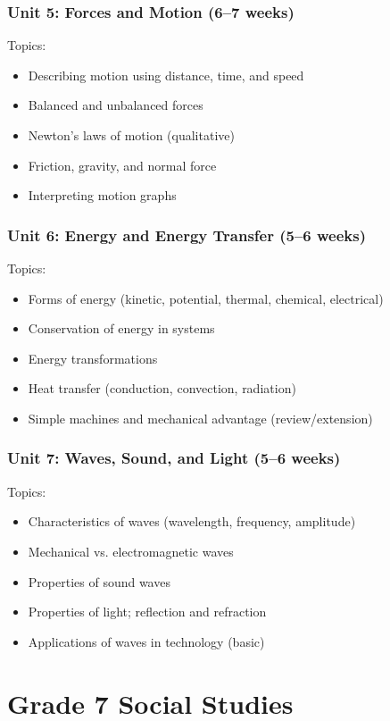 \documentclass[11pt,letterpaper]{report}
\begin{document}
\subsection{Unit 5: Forces and Motion (6–7 weeks)}

Topics:
\begin{itemize}
\item Describing motion using distance, time, and speed
\item Balanced and unbalanced forces
\item Newton’s laws of motion (qualitative)
\item Friction, gravity, and normal force
\item Interpreting motion graphs
\end{itemize}

\subsection{Unit 6: Energy and Energy Transfer (5–6 weeks)}

Topics:
\begin{itemize}
\item Forms of energy (kinetic, potential, thermal, chemical, electrical)
\item Conservation of energy in systems
\item Energy transformations
\item Heat transfer (conduction, convection, radiation)
\item Simple machines and mechanical advantage (review/extension)
\end{itemize}

\subsection{Unit 7: Waves, Sound, and Light (5–6 weeks)}

Topics:
\begin{itemize}
\item Characteristics of waves (wavelength, frequency, amplitude)
\item Mechanical vs. electromagnetic waves
\item Properties of sound waves
\item Properties of light; reflection and refraction
\item Applications of waves in technology (basic)
\end{itemize}


\chapter{Grade 7 Social Studies}
\end{document}
